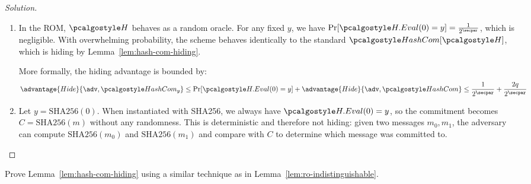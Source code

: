 \begin{proof}[Solution]
  \begin{enumerate}
    \item In the ROM, $\algo{H}$ behaves as a random oracle. For any fixed $y$, we have $\Pr[\algo{H.Eval}(0) = y] = \frac{1}{2^\secpar}$, which is negligible. With overwhelming probability, the scheme behaves identically to the standard $\algo{HashCom}[\algo{H}]$, which is hiding by Lemma~\ref{lem:hash-com-hiding}.
    
    More formally, the hiding advantage is bounded by:
    \[
    \advantage{Hide}{\adv, \algo{HashCom}_y} \leq \Pr[\algo{H.Eval}(0) = y] + \advantage{Hide}{\adv, \algo{HashCom}} \leq \frac{1}{2^\secpar} + \frac{2q}{2^\secpar}
    \]
    
    \item Let $y = \text{SHA256}(0)$. When instantiated with SHA256, we always have $\algo{H.Eval}(0) = y$, so the commitment becomes $C = \text{SHA256}(m)$ without any randomness. This is deterministic and therefore not hiding: given two messages $m_0, m_1$, the adversary can compute $\text{SHA256}(m_0)$ and $\text{SHA256}(m_1)$ and compare with $C$ to determine which message was committed to.
  \end{enumerate}
\end{proof}

\begin{exercise}
  Prove Lemma~\ref{lem:hash-com-hiding} using a similar technique as in Lemma~\ref{lem:ro-indistinguishable}.
\end{exercise}

